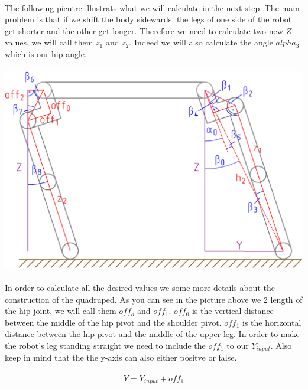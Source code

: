 \documentclass{article}
\begin{document}
    \paragraph{}
    The following picutre illustrats what we will calculate in the next step. The main problem is that if we shift the body sidewards, the legs of one side of the robot get shorter and the other get longer. Therefore we need to calculate two new $Z$ values, we will call them $z_1$ and $z_2$. Indeed we will also calculate the angle $alpha_3$ which is our hip angle.

    \paragraph{}
    \includegraphics[scale=0.2]{y-axis}

    \paragraph{}
    In order to calculate all the desired values we some more details about the construction of the quadruped. As you can see in the picture above we 2 length of the hip joint, we will call them $off_o$ and $off_1$. $off_0$ is the vertical distance between the middle of the hip pivot and the shoulder pivot. $off_1$ is the horizontal distance between the hip pivot and the middle of the upper leg. In order to make the robot's leg standing straight we need to include the $off_1$ to our $Y_{input}$. Also keep in mind that the the y-axis can also either positve or false.

    \paragraph{}
    \begin{equation}
        Y = Y_{input} + off_1
    \end{equation}
\end{document}
